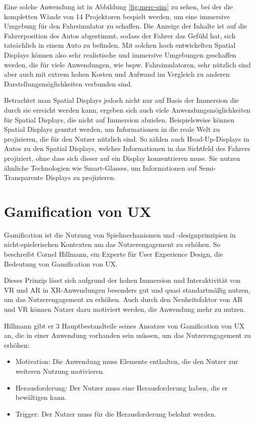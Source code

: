   Eine solche Anwendung ist in Abbildung \ref{fig:merc-sim} zu sehen, bei der die kompletten Wände von 14 Projektoren bespielt werden, um eine immersive Umgebung für den Fahrsimulator zu schaffen.
  Die Anzeige der Inhalte ist auf die Fahrerposition des Autos abgestimmt, sodass der Fahrer das Gefühl hat, sich tatsächlich in einem Auto zu befinden.
  Mit solchen hoch entwickelten Spatial Displays können also sehr realistische und immersive Umgebungen geschaffen werden, die für viele Anwendungen, wie bspw. Fahrsimulatoren, sehr nützlich sind aber auch mit extrem hohen Kosten und Aufwand im Vergleich zu anderen Darstellungsmöglichkeiten verbunden sind.

  Betrachtet man Spatial Displays jedoch nicht nur auf Basis der Immersion die durch sie erreicht werden kann, ergeben sich auch viele Anwendungsmöglichkeiten für Spatial Displays, die nicht auf Immersion abzielen.
  Beispielsweise können Spatial Displays genutzt werden, um Informationen in die reale Welt zu projizieren, die für den Nutzer nützlich sind.
  So zählen auch Head-Up-Displays in Autos zu den Spatial Displays, welches Informationen in das Sichtfeld des Fahrers projiziert, ohne dass sich dieser auf ein Display konzentrieren muss.
  Sie nutzen ähnliche Technologien wie Smart-Glasses, um Informationen auf Semi-Transparente Displays zu projizieren.

  
\section{Gamification von UX}
\label{sec:gamification-ux}

\glqq{}Gamification ist die Nutzung von Spielmechanismen und -designprinzipien in nicht-spielerischen Kontexten um das Nutzerengagement zu erhöhen.\grqq{} \autocite[][S.63]{hillmann2021ux} 
So beschreibt Cornel Hillmann, ein Experte für User Experience Design, die Bedeutung von Gamification von UX.

Dieses Prinzip lässt sich aufgrund der hohen Immersion und Interaktivität von VR und AR in XR-Anwendungen besonders gut und quasi standartmäßig nutzen, um das Nutzerengagement zu erhöhen.
Auch durch den Neuheitsfaktor von AR und VR können Nutzer dazu motiviert werden, die Anwendung mehr zu nutzen.

Hillmann gibt er 3 Hauptbestandteile seines Ansatzes von Gamification von UX an, die in einer Anwendung vorhanden sein müssen, um das Nutzerengagement zu erhöhen:
\begin{itemize}
  \item Motivation: Die Anwendung muss Elemente enthalten, die den Nutzer zur weiteren Nutzung motivieren.
  \item Herausforderung: Der Nutzer muss eine Herausforderung haben, die er bewältigen kann.
  \item Trigger: Der Nutzer muss für die Herausforderung belohnt werden.
\end{itemize}
\autocite[S.66]{hillmann2021ux}

